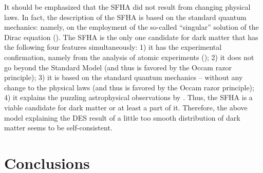 \documentclass[referee]{raa}            %
\begin{document}
   It should be emphasized that the SFHA did not result from changing physical laws. In fact, the description of the SFHA is based on the standard quantum mechanics: namely, on the employment of the so-called “singular” solution of the Dirac equation (\citealt{Oks+2001}).
The SFHA is the only one candidate for dark matter that has the following four features simultaneously: 1) it has the experimental confirmation, namely from the analysis of atomic experiments (\citealt{Oks+2001}); 2) it does not go beyond the Standard Model (and thus is favored by the Occam razor principle); 3) it is based on the standard quantum mechanics – without any change to the physical laws (and thus is favored by the Occam razor principle); 4) it explains the puzzling astrophysical observations by \cite{Bowman+etal+2018}.
Thus, the SFHA is a viable candidate for dark matter or at least a part of it. Therefore, the above model explaining the DES result of a little too smooth distribution of dark matter seems to be self-consistent. 

	
	
	\section{Conclusions}
	\label{sect:conclusion}
\end{document}
